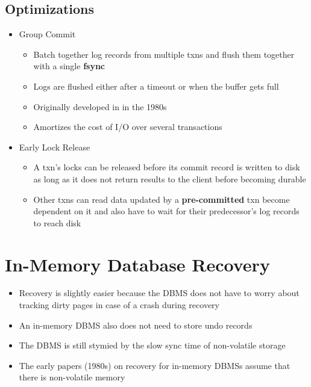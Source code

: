 \documentclass[11pt]{article}
\begin{document}
    \subsection*{Optimizations}
    \begin{itemize}
        \item Group Commit
        \begin{itemize}
            \item Batch together log records from multiple txns and flush them together with a single \textbf{fsync}
            \item Logs are flushed either after a timeout or when the buffer gets full
            \item Originally developed in  in the 1980s
            \item Amortizes the cost of I/O over several transactions
        \end{itemize}
        \item Early Lock Release
        \begin{itemize}
            \item A txn's locks can be released before its commit record is written to disk as long as it does not return results to the client before becoming durable
            \item Other txns can read data updated by a \textbf{pre-committed} txn become dependent on it and also have to wait for their predecessor's log records to reach disk
        \end{itemize}
    \end{itemize}

\section{In-Memory Database Recovery}
\begin{itemize}
    \item Recovery is slightly easier because the DBMS does not have to worry about tracking dirty pages in case of a crash during recovery
    \item An in-memory DBMS also does not need to store undo records
    \item The DBMS is still stymied by the slow sync time of non-volatile storage
    \item The early papers (1980s) on recovery for in-memory DBMSs assume that there is non-volatile memory ~\cite{p104-lehman}
\end{itemize}
\end{document}
